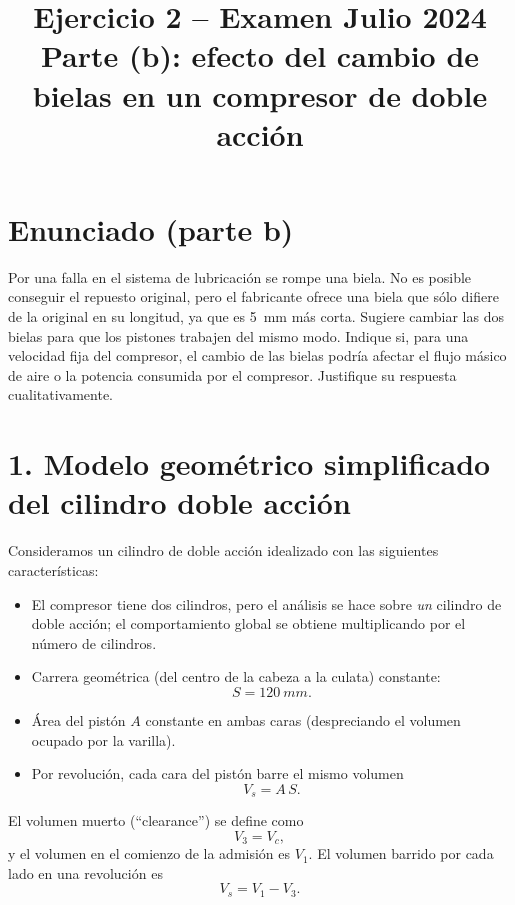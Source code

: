 \documentclass[11pt,a4paper]{article}
\begin{document}
\title{Ejercicio 2 -- Examen Julio 2024\\Parte (b): efecto del cambio de bielas en un compresor de doble acción}
\author{}
\date{}
\maketitle

\section*{Enunciado (parte b)}

Por una falla en el sistema de lubricación se rompe una biela. No es posible
conseguir el repuesto original, pero el fabricante ofrece una biela que sólo
difiere de la original en su longitud, ya que es \SI{5}{mm} más corta. Sugiere
cambiar las dos bielas para que los pistones trabajen del mismo modo. Indique
si, para una velocidad fija del compresor, el cambio de las bielas podría
afectar el flujo másico de aire o la potencia consumida por el compresor.
Justifique su respuesta cualitativamente.

\section*{1. Modelo geométrico simplificado del cilindro doble acción}

Consideramos un cilindro de doble acción idealizado con las siguientes
características:

\begin{itemize}
  \item El compresor tiene dos cilindros, pero el análisis se hace sobre \emph{un}
        cilindro de doble acción; el comportamiento global se obtiene
        multiplicando por el número de cilindros.
  \item Carrera geométrica (del centro de la cabeza a la culata) constante:
  \[
     S = \SI{120}{mm}.
  \]
  \item Área del pistón $A$ constante en ambas caras (despreciando el volumen
        ocupado por la varilla).
  \item Por revolución, cada cara del pistón barre el mismo volumen
  \[
     V_s = A\,S.
  \]
\end{itemize}

El volumen muerto (``clearance'') se define como
\[
V_3 = V_c,
\]
y el volumen en el comienzo de la admisión es $V_1$. El volumen barrido por
cada lado en una revolución es
\[
V_s = V_1 - V_3.
\]
\end{document}
